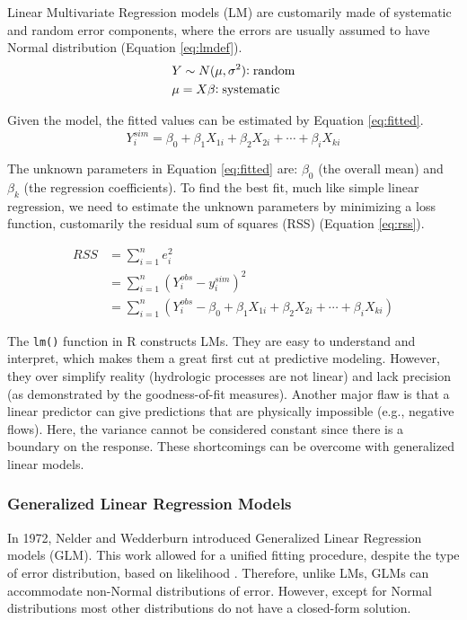 Linear Multivariate Regression models (LM) are customarily made of systematic and random error components, where the errors are usually assumed to have Normal distribution (Equation \ref{eq:lmdef}). 
\begin{equation} \label{eq:lmdef}
	\begin{aligned}
		& Y \sim N(\mu, \sigma \textsuperscript{2}) \mathrm{: random}  \\
		& \mu=X\beta \mathrm{: systematic}
	\end{aligned}
\end{equation} 

Given the model, the fitted values can be estimated by Equation \ref{eq:fitted}.
\begin{equation} \label{eq:fitted}
	Y^{sim}_i = \beta_{0} +\beta_{1} X_{1i} +\beta_{2} X_{2i} +\cdots +\beta_{i} X_{ki}
\end{equation} 

The unknown parameters in Equation \ref{eq:fitted} are: $\beta_{0}$ (the overall mean) and $\beta_{k}$ (the regression coefficients). To find the best fit, much like simple linear regression, we need to estimate the unknown parameters by minimizing a loss function, customarily the residual sum of squares (RSS) (Equation \ref{eq:rss}).

\begin{equation} \label{eq:rss}
	\begin{split}
		RSS &= \sum^n_{i=1}e^{2}_{i} \\
		&= \sum^n_{i=1}(Y^{obs}_{i} - y^{sim}_i)^2 \\
		&= \sum^n_{i=1}(Y^{obs}_{i}-\beta_{0} +\beta_{1} X_{1i} +\beta_{2} X_{2i} +\cdots +\beta_{i} X_{ki})
	\end{split}
\end{equation} 

The {\tt lm()} function in R constructs LMs. They are easy to understand and interpret, which makes them a great first cut at predictive modeling. However, they over simplify reality (hydrologic processes are not linear) and lack precision (as demonstrated by the goodness-of-fit measures). Another major flaw is that a linear predictor can give predictions that are physically impossible (e.g., negative flows). Here, the variance cannot be considered constant since there is a boundary on the response. These shortcomings can be overcome with generalized linear models. 

\subsubsection*{Generalized Linear Regression Models}
In 1972, Nelder and Wedderburn introduced Generalized Linear Regression models \linebreak (GLM). This work allowed for a unified fitting procedure, despite the type of error distribution, based on likelihood \cite{nelder1972generalized}. Therefore, unlike LMs, GLMs can accommodate non-Normal distributions of error. However, except for Normal distributions most other distributions do not have a closed-form solution. 

